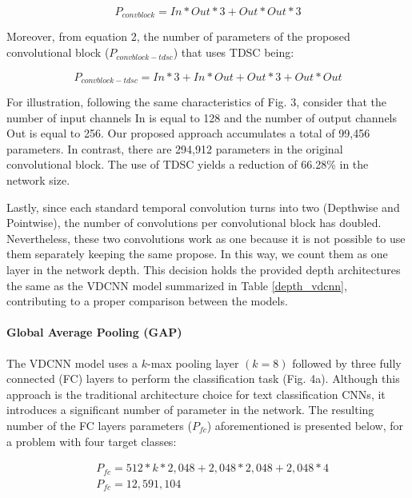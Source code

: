 \documentclass[conference]{IEEEtran}
\begin{document}
\begin{equation}
    P_{convblock} =  In \ast Out \ast 3 + Out \ast Out \ast 3 
\end{equation}

Moreover, from equation 2, the number of parameters of the proposed convolutional block ($P_{convblock-tdsc}$) that uses TDSC being:

\begin{equation}
    P_{convblock-tdsc} = In \ast 3 + In \ast Out + Out \ast 3  + Out \ast Out
\end{equation}

For illustration, following the same characteristics of Fig. 3, consider that the number of input channels In is equal to 128 and the number of output channels Out is equal to 256. Our proposed approach accumulates a total of 99,456 parameters. In contrast, there are 294,912 parameters in the original convolutional block. The use of TDSC yields a reduction of 66.28\% in the network size.

Lastly, since each standard temporal convolution turns into two  (Depthwise and Pointwise), the number of convolutions per convolutional block has doubled. Nevertheless, these two convolutions work as one because it is not possible to use them separately keeping the same propose. In this way, we count them as one layer in the network depth. This decision holds the provided depth architectures the same as the VDCNN model summarized in Table \ref{depth_vdcnn}, contributing to a proper comparison between the models. 

\paragraph{Global Average Pooling (GAP)}
The VDCNN model uses a $k$-max pooling layer $(k=8)$ followed by three fully connected (FC) layers to perform the classification task (Fig. 4a). Although this approach is the traditional architecture choice for text classification CNNs, it introduces a significant number of parameter in the network. The resulting number of the FC layers parameters ($P_{fc}$) aforementioned is presented below, for a problem with four target classes:

\begin{equation}
\begin{aligned}
     &  P_{fc} = 512 \ast k \ast 2,048 + 2,048 \ast 2,048 + 2,048 \ast 4 \\
    &  P_{fc} = 12,591,104
\end{aligned}
\end{equation}
\end{document}

